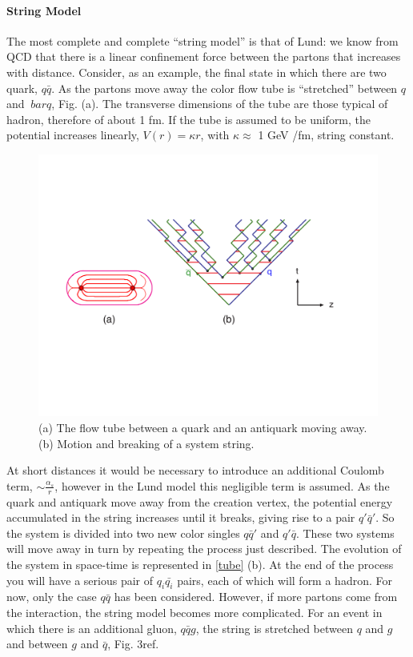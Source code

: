 \paragraph*{String Model}
The most complete and complete ``string model'' is that of Lund: we know from QCD that there is a linear confinement force between the partons that increases with distance. Consider, as an example, the final state in which there are two quark, $ q \bar{q} $. As the partons move away the color flow tube is ``stretched'' between $ q $ and $ \ bar {q} $, Fig.  (a). The transverse dimensions of the tube are those typical of hadron, therefore of about 1 fm.
If the tube is assumed to be uniform, the potential increases linearly, $ V (r) = \kappa r $, with $ \kappa \approx $ 1 GeV /fm, string constant.
\begin{figure}
\centering
\includegraphics[scale= 0.5]{../Cap3/Fig_MC/stringone}
\caption{(a) The flow tube between a quark and an antiquark moving away. (b) Motion and breaking of a system string.}
\label{tubo}
\end{figure}
At short distances it would be necessary to introduce an additional Coulomb term, $ \sim \frac{\alpha_s}{r} $, however in the Lund model this negligible term is assumed.
As the quark and antiquark move away from the creation vertex, the potential energy accumulated in the string increases until it breaks, giving rise to a pair $ q '\bar{q}' $. So the system is divided into two new color singles $ q \bar{q} '$ and $ q' \bar{q} $. These two systems will move away in turn by repeating the process just described. The evolution of the system in space-time is represented in \ref{tube} (b).
At the end of the process you will have a serious pair of $ q_i \bar{q_i} $ pairs, each of which will form a hadron.
For now, only the case $ q \bar{q} $ has been considered. However, if more partons come from the interaction, the string model becomes more complicated. For an event in which there is an additional gluon, $ q \bar{q} g $, the string is stretched between $ q $ and $ g $ and between $ g $ and $ \bar{q} $, Fig. \tubo3ref{}.


